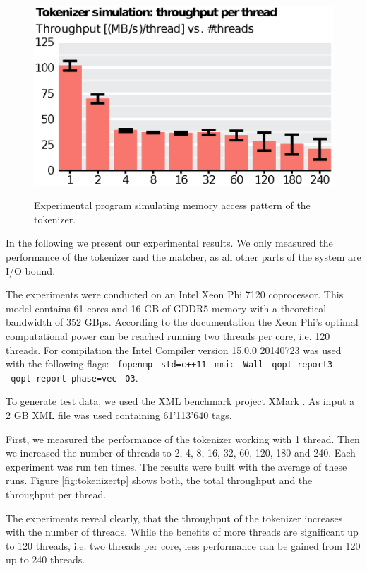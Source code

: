 \begin{figure}
    \includegraphics[scale=.45]{img/def/tokenizer_sim.eps} 
    \label{fig:tokenizersim}
    \caption{Experimental program simulating memory access pattern of the
    tokenizer.}
\end{figure}


In the following we present our experimental results. We only measured the
performance of the tokenizer and the matcher, as all other parts of the system
are I/O bound.

 The experiments were conducted on an Intel Xeon Phi
7120 coprocessor. This model contains 61 cores and 16 GB of GDDR5 memory with a
theoretical bandwidth of 352 GBps. According to the documentation the Xeon Phi's
optimal computational power can be reached running two threads per core, i.e.
120 threads. For compilation the Intel Compiler version 15.0.0 20140723 was used
with the following flags: \verb;-fopenmp; \verb;-std=c++11; \verb;-mmic;
\verb;-Wall; \verb;-qopt-report3; \\ \verb;-qopt-report-phase=vec; \verb;-O3;.

To generate test data, we used the XML benchmark project XMark
\cite{Schmidt2002}. As input a 2 GB XML file was used containing 61'113'640
tags. 

 First, we measured the performance of the tokenizer working
with 1 thread. Then we increased the number of threads to 2, 4, 8, 16, 32, 60,
120, 180 and 240. Each experiment was run ten times. The results were built
with the average of these runs. Figure \ref{fig:tokenizertp} shows both, the
total throughput and the throughput per thread.

The experiments reveal clearly, that the throughput of the tokenizer increases
with the number of threads. While the benefits of more threads are significant
up to 120 threads, i.e. two threads per core, less performance can be gained
from 120 up to 240 threads.


